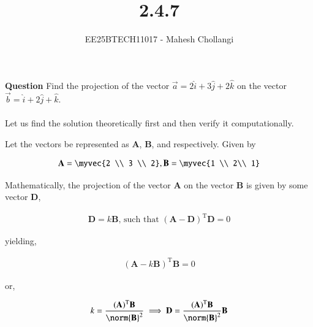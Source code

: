 \documentclass[journal]{IEEEtran}
\begin{document}

\vspace{3cm}

\title{2.4.7}
\author{EE25BTECH11017 - Mahesh Chollangi}
\maketitle
{\let\newpage\relax\maketitle}

\renewcommand{\thefigure}{\theenumi}
\renewcommand{\thetable}{\theenumi}
\setlength{\intextsep}{10pt} %


\renewcommand{\thetable}{\theenumi}

\textbf{Question}
Find the projection of the vector $\vec{a} = 2\hat{i}+3\hat{j}+2\hat{k}$ on the vector $\vec{b} = \hat{i}+2\hat{j}+\hat{k}$.\\
\solution\\

Let us find the solution theoretically first and then verify it computationally.

Let the vectors be represented as \textbf{A}, \textbf{B}, and respectively. Given by

\begin{align}
    \textbf{A} = \myvec{2 \\ 3 \\ 2}, \textbf{B} = \myvec{1 \\ 2\\ 1}
    \label{0.1}
\end{align}

Mathematically, the projection of the vector \textbf{A} on the vector \textbf{B} is given by some vector \textbf{D},

\begin{align}
    \textbf{D} = k\textbf{B}\text{, such that } (\textbf{A}-\textbf{D})^\text{T}\textbf{D}=0
    \label{0.2}
\end{align}

yielding,

\begin{align}
    (\textbf{A}-k\textbf{B})^\text{T}\textbf{B}=0
    \label{0.3}
\end{align}

or,


\begin{align}
    k=\frac{(\textbf{A})^\text{T}\textbf{B}}{\norm{\textbf{B}}^2} \implies \textbf{D} = \frac{(\textbf{A})^\text{T}\textbf{B}}{\norm{\textbf{B}}^2}\textbf{B}
    \label{0.4}
\end{align}
\end{document}
